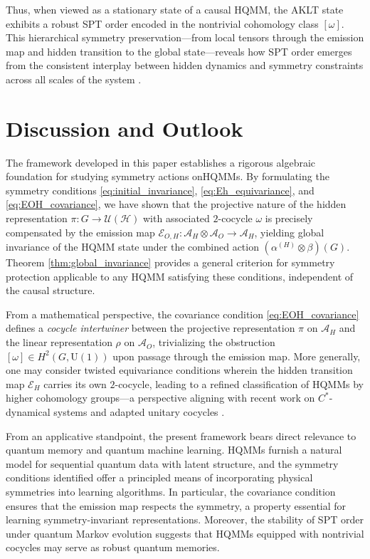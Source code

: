 \documentclass[12pt,a4paper]{article}
\begin{document}
Thus, when viewed as a stationary state of a causal HQMM, the AKLT state exhibits a robust SPT order encoded in the nontrivial cohomology class $[\omega]$. This hierarchical symmetry preservation—from local tensors through the emission map and hidden transition to the global state—reveals how SPT order emerges from the consistent interplay between hidden dynamics and symmetry constraints across all scales of the system \cite{Pollmann2010, Tas23}.



 \section{Discussion and Outlook}\label{Sect_Discussion}

The framework developed in this paper establishes a rigorous algebraic foundation for studying symmetry actions onHQMMs. By formulating the symmetry conditions \eqref{eq:initial_invariance}, \eqref{eq:Eh_equivariance}, and \eqref{eq:EOH_covariance}, we have shown that the projective nature of the hidden representation $\pi: G \to \mathcal{U}(\mathcal{H})$ with associated $2$-cocycle $\omega$ is precisely compensated by the emission map $\mathcal{E}_{O,H}: \mathcal{A}_H \otimes \mathcal{A}_O \to \mathcal{A}_H$, yielding global invariance of the HQMM state under the combined action $(\alpha^{(H)} \otimes \beta)(G)$. Theorem \ref{thm:global_invariance} provides a general criterion for symmetry protection applicable to any HQMM satisfying these conditions, independent of the causal structure.

From a mathematical perspective, the covariance condition \eqref{eq:EOH_covariance} defines a \textit{cocycle intertwiner} between the projective representation $\pi$ on $\mathcal{A}_H$ and the linear representation $\rho$ on $\mathcal{A}_O$, trivializing the obstruction $[\omega] \in H^2(G, \mathrm{U}(1))$ upon passage through the emission map. More generally, one may consider twisted equivariance conditions wherein the hidden transition map $\mathcal{E}_H$ carries its own $2$-cocycle, leading to a refined classification of HQMMs by higher cohomology groups—a perspective aligning with recent work on $C^*$-dynamical systems \cite{Soza19} and adapted unitary cocycles \cite{Vo25}.

From an applicative standpoint, the present framework bears direct relevance to quantum memory and quantum machine learning. HQMMs furnish a natural model for sequential quantum data with latent structure, and the symmetry conditions identified offer a principled means of incorporating physical symmetries into learning algorithms. In particular, the covariance condition ensures that the emission map respects the symmetry, a property essential for learning symmetry-invariant representations. Moreover, the stability of SPT order under quantum Markov evolution suggests that HQMMs equipped with nontrivial cocycles may serve as robust quantum memories.
\end{document}
